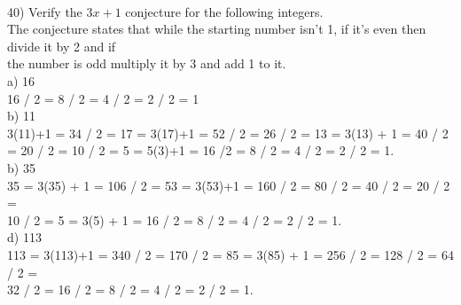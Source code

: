 \documentclass{article}
\begin{document}
\begin{flushleft}
~\\
\setlength\parindent{0pt}40) Verify the $3x+1$ conjecture for the following integers.\\
\setlength\parindent{24pt} The conjecture states that while the starting number isn't 1, if it's even then divide it by 2 and if \\the number is odd multiply it by 3 and add 1 to it.\\
\setlength\parindent{24pt}a) 16\\
\setlength\parindent{48pt} 16 / 2 = 8 / 2 = 4 / 2 = 2 / 2 = 1 \\
\setlength\parindent{24pt}b) 11 \\
\setlength\parindent{48pt} 3(11)+1 = 34 / 2 = 17 = 3(17)+1 = 52 / 2 = 26 / 2 = 13 = 3(13) + 1 = 40 / 2 \\= 20 / 2 = 10 / 2 = 5 = 5(3)+1 = 16 /2 = 8 / 2 = 4 / 2 = 2 / 2 = 1.\\
\setlength\parindent{24pt}b) 35 \\
\setlength\parindent{48pt} 35 = 3(35) + 1 = 106 / 2 = 53 = 3(53)+1 = 160 / 2 = 80 / 2 = 40 / 2 = 20 / 2 = \\10 / 2 = 5 = 3(5) + 1 = 16 / 2  = 8 / 2 = 4 / 2 = 2 / 2 = 1.\\
\setlength\parindent{24pt}d) 113 \\
\setlength\parindent{48pt} 113 = 3(113)+1 = 340 / 2 = 170 / 2 = 85 = 3(85) + 1 = 256 / 2 = 128 / 2 = 64 / 2 = \\32 / 2 = 16 / 2 = 8 / 2  = 4 / 2 = 2 / 2 = 1.





\end{flushleft}
\end{document}

